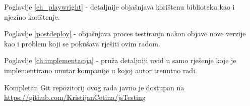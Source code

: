 Poglavlje \ref{ch_playwright} -  detaljnije objašnjava korištenu biblioteku kao i njezino korištenje.

Poglavlje \ref{postdeploy} -  objašnjava proces testiranja nakon objave nove verzije kao i problem koji se pokušava rješiti ovim radom.

Poglavlje \ref{ch:implementacija} -  pruža detaljniji uvid u samo rješenje koje je implementirano unutar kompanije u kojoj autor trenutno radi.

Kompletan Git repozitorij ovog rada javno je dostupan na \url{https://github.com/KristijanCetina/jsTesting}